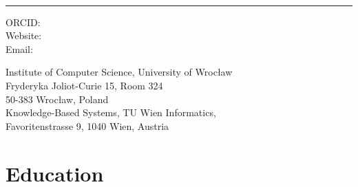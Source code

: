 \documentclass[10pt,a4paper]{article}
\begin{document}
\begin{minipage}[t]{0.5\textwidth}
  {\fontsize{20pt}{0}\selectfont\MyName}
\end{minipage}
\begin{minipage}[t]{0.5\textwidth}
  \begin{flushright}
    \Title{}
  \end{flushright}
\end{minipage}
\\[-0.1cm]
\textcolor{lightgray}{\rule{\textwidth}{3pt}}
\begin{minipage}[t]{0.5\textwidth}
  ORCID: \href{https://orcid.org/\ORCID}{\ORCID}
  \\
  Website: \Website{\PersonalWebsite}
  \\
  Email: \href{mailto:\Email}{\Email}
\end{minipage}
\begin{minipage}[t]{0.5\textwidth}
  \begin{flushright}
  Institute of Computer Science, University of Wrocław\\
  Fryderyka Joliot-Curie 15, Room 324\\
  50-383 Wrocław, Poland\\
  Knowledge-Based Systems, TU Wien Informatics,
  \\
  Favoritenstrasse 9, 1040 Wien, Austria 
  \end{flushright}
\end{minipage}
\vspace{0.3cm}


\section{Education}
\end{document}
